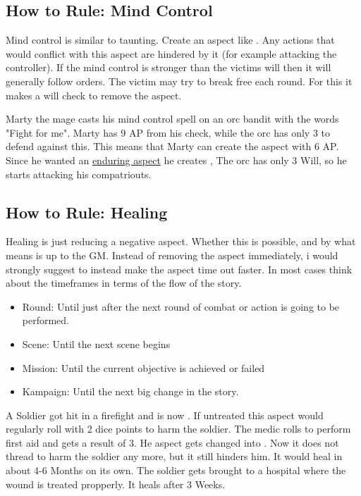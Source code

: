\documentclass[11pt]{article}
\begin{document}
{\subsection{How to Rule: Mind Control}
\label{sec:org0f86559}
Mind control is similar to taunting. Create an aspect like . Any actions that would conflict with this aspect are hindered by it (for example attacking the controller). If the mind control is stronger than the victims will then it will generally follow orders. The victim may try to break free each round. For this it makes a will check to remove the  aspect.

\begin{pwexample}
Marty the mage casts his mind control spell on an orc bandit with the words "Fight for me". Marty has 9 AP from his check, while the orc has only 3 to defend against this. This means that Marty can create the aspect with 6 AP. Since he wanted an \hyperref[sec:orgbfa3fe3]{enduring aspect} he creates , The orc has only 3 Will, so he starts attacking his compatriouts. 
\end{pwexample}

\subsection{How to Rule: Healing}
\label{sec:org131cc8d}
Healing is just reducing a negative aspect. Whether this is possible, and by what means is up to the GM. Instead of removing the aspect immediately, i would strongly suggest to instead make the aspect time out faster. In most cases think about the timeframes in terms of the flow of the story.
\begin{itemize}
\item Round: Until just after the next round of combat or action is going to be performed.
\item Scene: Until the next scene begins
\item Mission: Until the current objective is achieved or failed
\item Kampaign: Until the next big change in the story.
\end{itemize}

\begin{pwexample}
A Soldier got hit in a firefight and is now . If untreated this aspect would regularly roll with 2 dice points to harm the soldier. The medic rolls to perform first aid and gets a result of 3. He aspect gets changed into . Now it does not thread to harm the soldier any more, but it still hinders him. It would heal in about 4-6 Months on its own. The soldier gets brought to a hospital where the wound is treated propperly. It heals after 3 Weeks. 
\end{pwexample}

}
\end{document}
